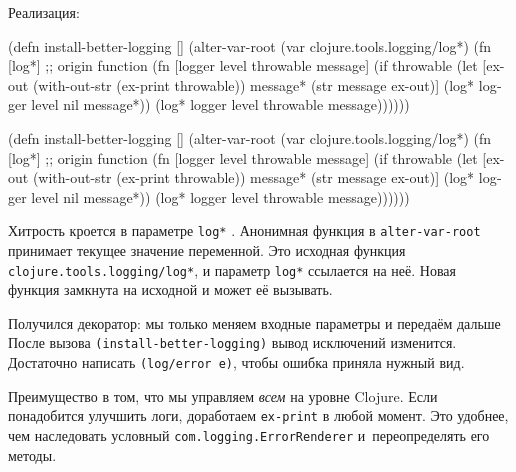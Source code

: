 \noindent
Реализация:


\ifx\DEVICETYPE\MOBILE

\begin{english}
  \begin{clojure/lines}
(defn install-better-logging []
  (alter-var-root
   (var clojure.tools.logging/log*)
   (fn [log*] ;; origin function
     (fn [logger level
          throwable message]
       (if throwable
         (let [ex-out (with-out-str
                        (ex-print
                          throwable))
               message* (str message
                          \newline
                          ex-out)]
           (log* logger
             level nil message*))
           (log* logger level
             throwable message))))))
  \end{clojure/lines}
\end{english}

\else

\begin{english}
  \begin{clojure/lines}
(defn install-better-logging []
  (alter-var-root
   (var clojure.tools.logging/log*)
   (fn [log*] ;; origin function
     (fn [logger level throwable message]
       (if throwable
         (let [ex-out (with-out-str (ex-print throwable))
               message* (str message \newline ex-out)]
           (log* logger level nil message*))
         (log* logger level throwable message))))))
  \end{clojure/lines}
\end{english}

\fi

\mnoindent
Хитрость кроется в параметре \verb|log*| . Анонимная функция в
\verb|alter-var-root| принимает текущее значение переменной. Это исходная
функция \verb|clojure.tools.logging/log*|, и параметр \verb|log*| ссылается
на неё. Новая функция замкнута на исходной и может её вызывать.

Получился декоратор: мы только меняем входные параметры и передаём дальше После
вызова \verb|(install-better-logging)| вывод исключений изменится. Достаточно
написать \verb|(log/error e)|, чтобы ошибка приняла нужный вид.

Преимущество в том, что мы управляем \emph{всем} на уровне Clojure. Если
понадобится улучшить логи, доработаем \verb|ex-print| в любой момент. Это
удобнее, чем наследовать условный \verb|com.logging.ErrorRenderer|
и~переопределять его методы.

